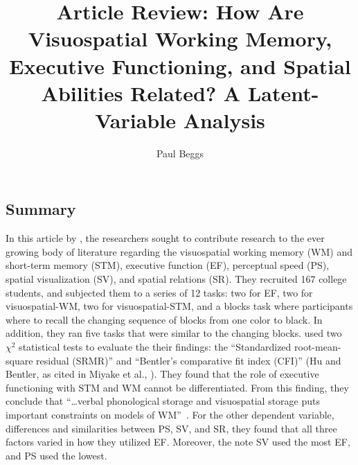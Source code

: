 \documentclass[stu,12pt,floatsintext]{apa7}
\title{Article Review: How Are Visuospatial Working Memory, Executive Functioning, and Spatial Abilities Related? A Latent-Variable Analysis} %
\author{Paul Beggs}
\affiliation{Department of Psychology, Hendrix College}
\begin{document}
\maketitle %

\subsection{Summary}

In this article by \textcite{miyake2001visuospatial}, the researchers sought to contribute research to the ever growing body of literature regarding the visuospatial working memory (WM) and short-term memory (STM), executive function (EF), perceptual speed (PS), spatial visualization (SV), and spatial relations (SR). They recruited 167 college students, and subjected them to a series of 12 tasks: two for EF, two for visuospatial-WM, two for visuospatial-STM, and a blocks task where participants where to recall the changing sequence of blocks from one color to black. In addition, they ran five tasks that were similar to the changing blocks. \textcite{miyake2001visuospatial} used two \(\chi^2\) statistical tests to evaluate the their findings: the ``Standardized root-mean-square residual (SRMR)'' and ``Bentler's comparative fit index (CFI)'' (Hu and Bentler, \citeyear{hu1998fit} as cited in Miyake et al., \citeyear{miyake2001visuospatial}). They found that the role of executive functioning with STM and WM cannot be differentiated. From this finding, they conclude that ``\dots verbal phonological storage and visuospatial storage puts important constraints on models of WM''~\parencite{miyake2001visuospatial}. For the other dependent variable, differences and similarities between PS, SV, and SR, they found that all three factors varied in how they utilized EF. Moreover, the note SV used the most EF, and PS used the lowest.    

\printbibliography
\end{document}
